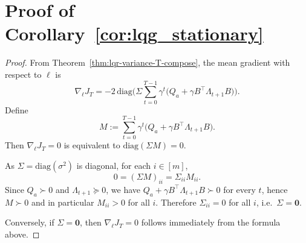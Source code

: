\section{Proof of Corollary~\ref{cor:lqg_stationary}}
\label{sec:app-proof-lqg-stationary}

\begin{proof}
From Theorem~\ref{thm:lqr-variance-T-compose}, the mean gradient with respect to $\ell$ is
\[
\nabla_{\ell} J_T
=
-2\,\mathrm{diag} \Big(\Sigma\sum_{t=0}^{T-1}\gamma^t\big( Q_a + \gamma B^\top \Lambda_{t+1} B \big)\Big).
\]
Define
\[
M := \sum_{t=0}^{T-1}\gamma^t\big( Q_a + \gamma B^\top \Lambda_{t+1} B \big).
\]
Then $\nabla_\ell J_T=0$ is equivalent to $\mathrm{diag}(\Sigma M)=0$.

As $\Sigma=\mathrm{diag}(\sigma^2)$ is diagonal, for each $i\in[m]$,
\[
0=(\Sigma M)_{ii}=\Sigma_{ii}M_{ii}.
\]
Since $Q_a\succ 0$ and $\Lambda_{t+1}\succeq 0$, we have
$Q_a+\gamma B^\top \Lambda_{t+1}B \succ 0$ for every $t$, hence $M\succ 0$ and in particular
$M_{ii}>0$ for all $i$. Therefore $\Sigma_{ii}=0$ for all $i$, i.e.\ $\Sigma=\mathbf 0$.

Conversely, if $\Sigma=\mathbf 0$, then $\nabla_\ell J_T=0$ follows immediately from the formula above.
\end{proof}
